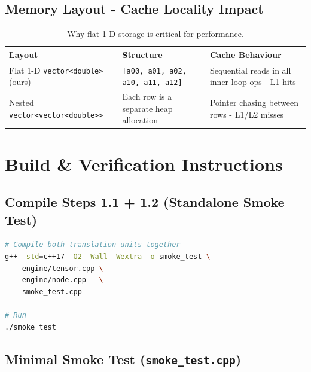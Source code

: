 \documentclass[12pt, a4paper]{article}
\begin{document}
\subsection{Memory Layout - Cache Locality Impact}

\begin{table}[!ht]
\centering
\renewcommand{\arraystretch}{1.35}
\begin{tabularx}{\textwidth}{@{} l L L @{}}
\toprule
\textbf{Layout} & \textbf{Structure} & \textbf{Cache Behaviour} \\
\midrule
Flat 1-D \texttt{vector<double>} (ours)
  & \texttt{[a00, a01, a02, a10, a11, a12]}
  & Sequential reads in all inner-loop ops - L1 hits \\
Nested \texttt{vector<vector<double>>}
  & Each row is a separate heap allocation
  & Pointer chasing between rows - L1/L2 misses \\
\bottomrule
\end{tabularx}
\caption{Why flat 1-D storage is critical for performance.}
\end{table}

\section{Build \& Verification Instructions}

\subsection{Compile Steps 1.1 + 1.2 (Standalone Smoke Test)}

\begin{lstlisting}[language=bash, caption={Build commands (WSL2 / Linux)},
  morekeywords={g++,echo,./},
  keywordstyle=\bfseries\color{keyword}]
# Compile both translation units together
g++ -std=c++17 -O2 -Wall -Wextra -o smoke_test \
    engine/tensor.cpp \
    engine/node.cpp   \
    smoke_test.cpp

# Run
./smoke_test
\end{lstlisting}

\subsection{Minimal Smoke Test (\texttt{smoke\_test.cpp})}
\end{document}
